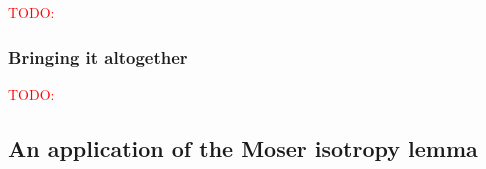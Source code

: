 \documentclass[notitlepage]{article}
\begin{document}
\textcolor{red}{TODO:}

\subsubsection{Bringing it altogether}

\textcolor{red}{TODO:}


%
%
%


\subsection{An application of the Moser isotropy lemma}
\end{document}
